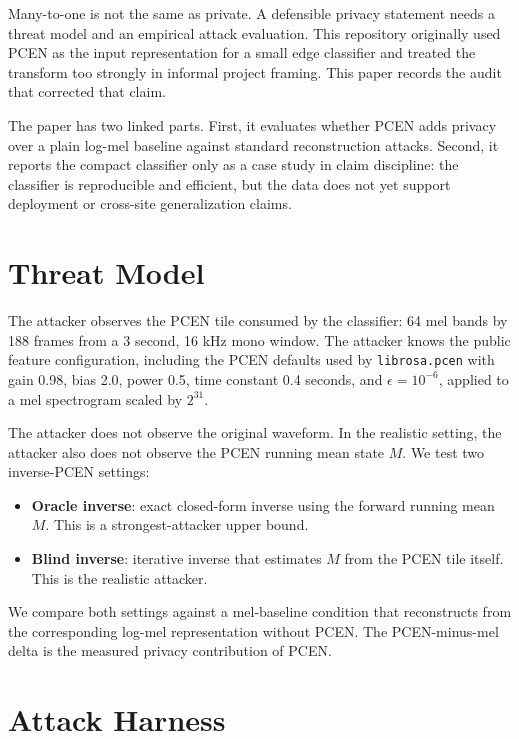 \documentclass[twocolumn]{article}
\begin{document}
Many-to-one is not the same as private. A defensible privacy statement needs a
threat model and an empirical attack evaluation. This repository originally
used PCEN as the input representation for a small edge classifier and treated
the transform too strongly in informal project framing. This paper records the
audit that corrected that claim.

The paper has two linked parts. First, it evaluates whether PCEN adds privacy
over a plain log-mel baseline against standard reconstruction attacks. Second,
it reports the compact classifier only as a case study in claim discipline: the
classifier is reproducible and efficient, but the data does not yet support
deployment or cross-site generalization claims.

\section{Threat Model}

The attacker observes the PCEN tile consumed by the classifier: 64 mel bands by
188 frames from a 3 second, 16 kHz mono window. The attacker knows the public
feature configuration, including the PCEN defaults used by \texttt{librosa.pcen}
with gain 0.98, bias 2.0, power 0.5, time constant 0.4 seconds, and
\(\epsilon=10^{-6}\), applied to a mel spectrogram scaled by \(2^{31}\).

The attacker does not observe the original waveform. In the realistic setting,
the attacker also does not observe the PCEN running mean state \(M\). We test
two inverse-PCEN settings:

\begin{itemize}
  \item \textbf{Oracle inverse}: exact closed-form inverse using the forward
  running mean \(M\). This is a strongest-attacker upper bound.
  \item \textbf{Blind inverse}: iterative inverse that estimates \(M\) from the
  PCEN tile itself. This is the realistic attacker.
\end{itemize}

We compare both settings against a mel-baseline condition that reconstructs
from the corresponding log-mel representation without PCEN. The PCEN-minus-mel
delta is the measured privacy contribution of PCEN.

\section{Attack Harness}
\end{document}
